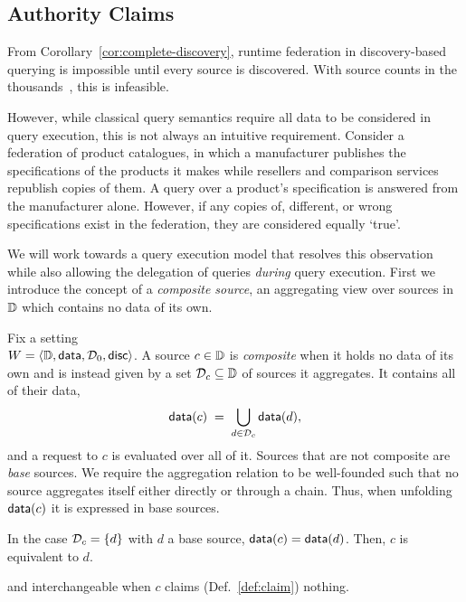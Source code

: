 \subsection{Authority Claims}

From Corollary~\ref{cor:complete-discovery}, runtime federation in discovery-based
querying is impossible until every source is discovered. With source counts in the
thousands~, this is infeasible.

However, while classical query semantics require all data to be considered in query execution,
this is not always an intuitive requirement. 
Consider a federation of product catalogues, in which a manufacturer publishes the
specifications of the products it makes while resellers and comparison services
republish copies of them. A query over a product's specification is answered from the
manufacturer alone. However, if any copies of, different, or wrong specifications exist 
in the federation, they are considered equally `true'.


We will work towards a query execution model that resolves this observation while
also allowing the delegation of queries \emph{during} query execution.
First we introduce the concept of a \emph{composite source},
an aggregating view over sources in $\mathbb{D}$ which contains no data of its own.

\begin{definition}
\label{def:composite}
  Fix a setting \\ $W = \langle \mathbb{D}, \mathsf{data}, \mathcal{D}_0, \mathsf{disc} \rangle$. A source $c \in \mathbb{D}$ is
  \emph{composite} when it holds no data of its own and is instead given by a set
  $\mathcal{D}_c \subseteq \mathbb{D}$ of sources it aggregates. It contains all of their data,
  \[
    \mathsf{data}(c) \;=\; \bigcup_{d \in \mathcal{D}_c} \mathsf{data}(d),
  \]
  and a request to $c$ is evaluated over all of it. Sources that are not composite are
  \emph{base} sources. We require the aggregation relation to be well-founded 
  such that no source aggregates itself either directly or through a chain. 
  Thus, when unfolding $\mathsf{data}(c)$ it is expressed
  in base sources.
\end{definition}

In the case $\mathcal{D}_c = \{d\}$ with $d$ a base source, $\mathsf{data}(c) = \mathsf{data}(d)$. Then,
$c$ is equivalent to $d$.

and interchangeable when $c$ claims (Def.~\ref{def:claim}) nothing. 



